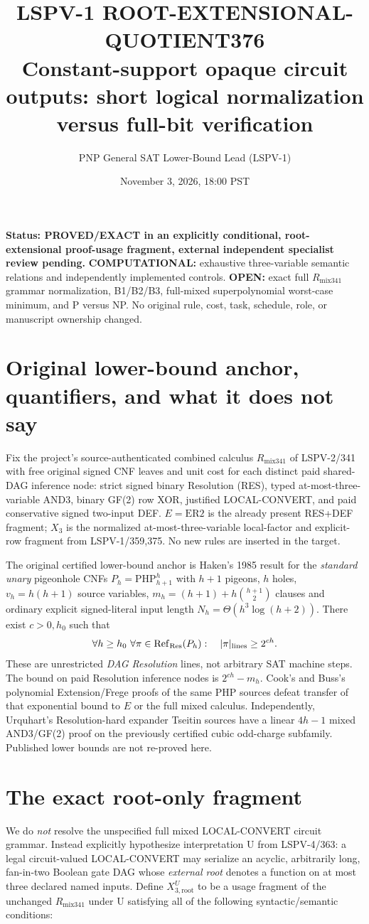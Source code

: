 \documentclass[11pt]{article}
\title{LSPV-1 ROOT-EXTENSIONAL-QUOTIENT376\\
\large Constant-support opaque circuit outputs: short logical normalization versus full-bit verification}
\author{PNP General SAT Lower-Bound Lead (LSPV-1)}
\date{November 3, 2026, 18:00 PST}
\begin{document}
\maketitle

\noindent\textbf{Status: PROVED/EXACT in an explicitly conditional, root-extensional proof-usage fragment, external independent specialist review pending.}
\textbf{COMPUTATIONAL:} exhaustive three-variable semantic relations and independently implemented controls.
\textbf{OPEN:} exact full $R_{\mathrm{mix341}}$ grammar normalization, B1/B2/B3, full-mixed superpolynomial worst-case minimum, and P versus NP. No original rule, cost, task, schedule, role, or manuscript ownership changed.

\section*{Original lower-bound anchor, quantifiers, and what it does not say}
Fix the project's source-authenticated combined calculus $R_{\mathrm{mix341}}$ of LSPV-2/341 with free original signed CNF leaves and unit cost for each distinct paid shared-DAG inference node: strict signed binary Resolution (RES), typed at-most-three-variable AND3, binary GF(2) row XOR, justified LOCAL-CONVERT, and paid conservative signed two-input DEF. $E=\mathrm{ER2}$ is the already present RES+DEF fragment; $X_3$ is the normalized at-most-three-variable local-factor and explicit-row fragment from LSPV-1/359,375. No new rules are inserted in the target.

The original certified lower-bound anchor is Haken's 1985 result for the \emph{standard unary} pigeonhole CNFs $P_h=\mathrm{PHP}^{h}_{h+1}$ with $h+1$ pigeons, $h$ holes, $v_h=h(h+1)$ source variables, $m_h=(h+1)+h\binom{h+1}{2}$ clauses and ordinary explicit signed-literal input length $N_h=\Theta(h^3\log(h+2))$. There exist $c>0,h_0$ such that
\[
\forall h\ge h_0\ \forall\pi\in\operatorname{Ref}_{\rm Res}(P_h):
\quad |\pi|_{\rm lines}\ge 2^{ch}.
\]
These are unrestricted \emph{DAG Resolution} lines, not arbitrary SAT machine steps. The bound on paid Resolution inference nodes is $2^{ch}-m_h$. Cook's and Buss's polynomial Extension/Frege proofs of the same PHP sources defeat transfer of that exponential bound to $E$ or the full mixed calculus. Independently, Urquhart's Resolution-hard expander Tseitin sources have a linear $4h-1$ mixed AND3/GF(2) proof on the previously certified cubic odd-charge subfamily. Published lower bounds are not re-proved here.

\section*{The exact root-only fragment}
We do \emph{not} resolve the unspecified full mixed LOCAL-CONVERT circuit grammar. Instead explicitly hypothesize interpretation U from LSPV-4/363: a legal circuit-valued LOCAL-CONVERT may serialize an acyclic, arbitrarily long, fan-in-two Boolean gate DAG whose \emph{external root} denotes a function on at most three declared named inputs. Define $X_{3,\mathrm{root}}^{U}$ to be a usage fragment of the unchanged $R_{\mathrm{mix341}}$ under U satisfying all of the following syntactic/semantic conditions:
\end{document}
